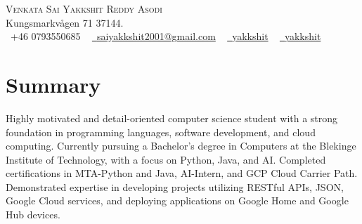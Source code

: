 \documentclass[letterpaper,11pt]{article}
\begin{document}

\begin{center}
    {\Huge \scshape Venkata Sai Yakkshit Reddy Asodi}~\href{https://www.cedzlabs.com/yakkshit}{\vspace{1pt}}\\
    Kungsmarkvågen 71 37144. \\ \vspace{1pt}
    \small \raisebox{-0.1\height}\faPhone\ +46 0793550685 ~ \href{mailto:saiyakkshit2001@gmail.com}{\raisebox{-0.2\height}\faEnvelope\  {saiyakkshit2001@gmail.com}} ~ 
    \href{https://linkedin.com/in/yakkshit/}{\raisebox{-0.2\height}\faLinkedin\ {yakkshit}}  ~
    \href{https://cedzlabs.com/yakkshit}{\raisebox{-0.2\height}\faRss\ {yakkshit}}  ~
    \href{https://github.com/saiyakkshit}{\raisebox{-0.2\height}}
    \vspace{-8pt}
\end{center}
\section{Summary}
Highly motivated and detail-oriented computer science student with a strong foundation in programming languages, software development, and cloud computing. Currently pursuing a Bachelor's degree in Computers at the Blekinge Institute of Technology, with a focus on Python, Java, and AI. Completed certifications in MTA-Python and Java, AI-Intern, and GCP Cloud Carrier Path. Demonstrated expertise in developing projects utilizing RESTful APIs, JSON, Google Cloud services, and deploying applications on Google Home and Google Hub devices.
\end{document}
